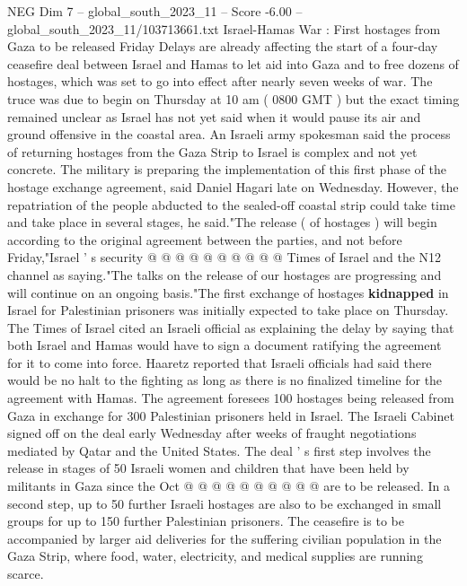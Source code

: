 \begin{textsample}{NEG Dim 7 – global\_south\_2023\_11 – Score -6.00 – global\_south\_2023\_11/103713661.txt}  \label{ex:f7_neg_327}
Israel-Hamas War : First hostages from Gaza to be released Friday Delays are already affecting the start of a four-day ceasefire deal between Israel and Hamas to let aid into Gaza and to free dozens of hostages, which was set to go into effect after nearly seven weeks of war.
The truce was due to begin on Thursday at 10 am ( 0800 GMT ) but the exact timing remained unclear as Israel has not yet said when it would pause its air and ground offensive in the coastal area.
An Israeli army spokesman said the process of returning hostages from the Gaza Strip to Israel is complex and not yet concrete.
The military is preparing the implementation of this first phase of the hostage exchange agreement, said Daniel Hagari late on Wednesday.
However, the repatriation of the people abducted to the sealed-off coastal strip could take time and take place in several stages, he said."The release ( of hostages ) will begin according to the original agreement between the parties, and not before Friday,"Israel ' s security @ @ @ @ @ @ @ @ @ @ Times of Israel and the N12 channel as saying."The talks on the release of our hostages are progressing and will continue on an ongoing basis."The first exchange of hostages \textbf{kidnapped} in Israel for Palestinian prisoners was initially expected to take place on Thursday.
The Times of Israel cited an Israeli official as explaining the delay by saying that both Israel and Hamas would have to sign a document ratifying the agreement for it to come into force.
Haaretz reported that Israeli officials had said there would be no halt to the fighting as long as there is no finalized timeline for the agreement with Hamas.
The agreement foresees 100 hostages being released from Gaza in exchange for 300 Palestinian prisoners held in Israel.
The Israeli Cabinet signed off on the deal early Wednesday after weeks of fraught negotiations mediated by Qatar and the United States.
The deal ' s first step involves the release in stages of 50 Israeli women and children that have been held by militants in Gaza since the Oct @ @ @ @ @ @ @ @ @ @ are to be released.
In a second step, up to 50 further Israeli hostages are also to be exchanged in small groups for up to 150 further Palestinian prisoners.
The ceasefire is to be accompanied by larger aid deliveries for the suffering civilian population in the Gaza Strip, where food, water, electricity, and medical supplies are running scarce.

\end{textsample}
